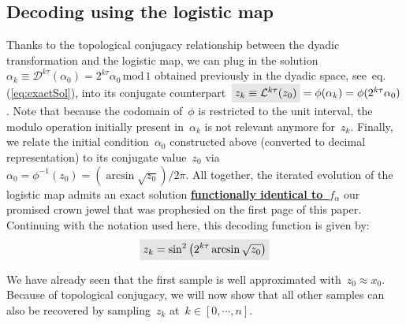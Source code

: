 \documentclass{article}
\newcommand{\highlight}[2][yellow]{\mathchoice%
  {\colorbox{#1}{$\displaystyle#2$}}%
  {\colorbox{#1}{$\textstyle#2$}}%
  {\colorbox{#1}{$\scriptstyle#2$}}%
  {\colorbox{#1}{$\scriptscriptstyle#2$}}}%
\begin{document}
\subsection{Decoding using the logistic map}

Thanks to the topological conjugacy relationship between the dyadic transformation and the logistic map, we can plug in the solution~$\alpha_k \equiv \mathcal{D}^{k\tau}(\alpha_0) =  2^{k\tau}\alpha_0 \, \text{mod} \, 1$ obtained previously in the dyadic space, see~eq.(\ref{eq:exactSol}), into its conjugate counterpart~$\highlight[black!10]{z_k \equiv \mathcal{L}^{k\tau} (z_0)} = \phi(\alpha_k) = \phi(2^{k\tau} \alpha_0 )$.  Note that because the codomain of~$\phi$ is restricted to the unit interval, the modulo operation initially present in~$\alpha_k$ is not relevant anymore for~$z_k$.  Finally, we relate the initial condition~$\alpha_0$ constructed above (converted to decimal representation) to its conjugate value~$z_0$ via~$\alpha_0 = \phi^{-1} (z_0) = ( \arcsin{\sqrt{z_0}} ) /2\pi$.  All together, the iterated evolution of the logistic map admits an exact solution \dSmiley \dSmiley \dSmiley \underline{\bf functionally identical to~$f_\alpha$} \dSmiley \dSmiley \dSmiley our promised crown jewel that was prophesied on the first page of this paper.  Continuing with the notation used here, this decoding function is given by:
\begin{equation}
\highlight[black!10]{z_k = \sin^2 \left( 2^{k\tau} \arcsin{\sqrt{z_0}}  \right)}
\label{eq:logisticExact}
\end{equation}

\noindent We have already seen that the first sample is well approximated with~$z_0 \approx x_0$.  Because of topological conjugacy, we will now show that all other samples can also be recovered by sampling~$z_k$ at~$k\in[0,\cdots,n]$. \\
\end{document}

